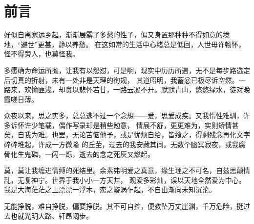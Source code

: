 \part{前言}

\vspace*{2\ccwd}

\hspace*{2em} 好似自离家远乡起，渐渐展露了多愁的性子，偏又身置那种种不得如意的境地，“避世”更甚，静以养愁。
在这如常的生活中心绪总是低回，人世毋许畅怀，怪不得旁人，也莫怪我。

\vspace*{\ccwd}

\hspace*{2em} 多愿确为命运所抛，让我有以怨怼，可是啊，现实中历历所遇，无不是每步路选定后切真的折射，未有一处非是天理的徇规，
其道昭明，我蓄忿已极尽诉空然。一路来，欢愉匪浅，却贪以悲怀若甘，一路云凝不开。默默青山，悠悠绿水，徒对晚霞嗟日薄。

\vspace*{\ccwd}

\hspace*{2em} 众夜以来，思之实多，总总逃不过一个念想——爱，思爱成疾。又我惰性难驯，许多诉怀许少笔载，偶作写录却是稍些勉意，
情展不舒，更更难为，实则矫情甚矣，自我为难。也罢，无论苦恼他予，或是忧烦自给，皆飨之，得剩残念再化文字碎碎堆起，许成一方微隆
的丘茔，过去的我安藏其间。无数个幽冥寂夜，或我腐骨化生鬼磷，一闪一烁，逝去的念之死灰又燃起。

\vspace*{\ccwd}

\hspace*{2em} 莫，莫让我缠进情缚的死结里。余素弗明爱之真意，缘生理之不可名，自兹思颠情乱，无复神宁。世界于我小小一方天井，
观爱多彩灿，误以天地全然爱为中心。我是大海茫茫之上漂漂一浮木，恋之漩涡乍起，不自由渐向未知沉沦。

\vspace*{\ccwd}
\hspace*{2em} 无能挣脱，难自挣脱，偏要挣脱。其不可自控，便教坠万丈崖渊，千万危险，挺过去也就光明大路、轩昂阔步。

\newpage
